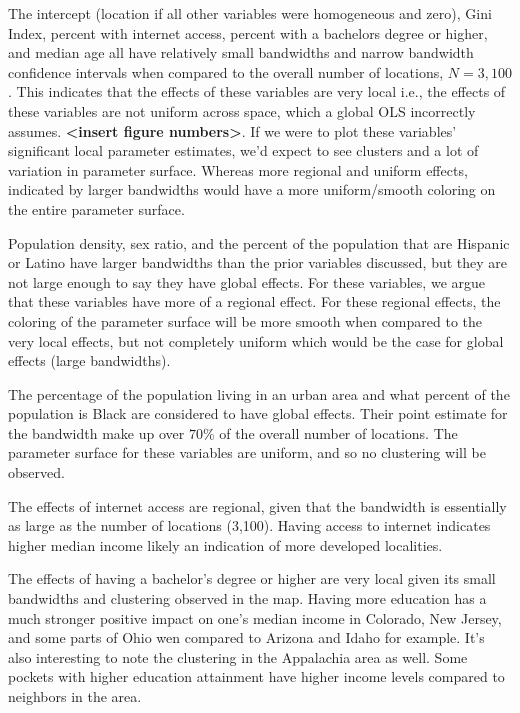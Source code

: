 \documentclass[
]{article}
\begin{document}
The intercept (location if all other variables were homogeneous and
zero), Gini Index, percent with internet access, percent with a
bachelors degree or higher, and median age all have relatively small
bandwidths and narrow bandwidth confidence intervals when compared to
the overall number of locations, \(N = 3,100\). This indicates that the
effects of these variables are very local i.e., the effects of these
variables are not uniform across space, which a global OLS incorrectly
assumes. \textbf{\textless insert figure numbers\textgreater{}}. If we
were to plot these variables' significant local parameter estimates,
we'd expect to see clusters and a lot of variation in parameter surface.
Whereas more regional and uniform effects, indicated by larger
bandwidths would have a more uniform/smooth coloring on the entire
parameter surface.

Population density, sex ratio, and the percent of the population that
are Hispanic or Latino have larger bandwidths than the prior variables
discussed, but they are not large enough to say they have global
effects. For these variables, we argue that these variables have more of
a regional effect. For these regional effects, the coloring of the
parameter surface will be more smooth when compared to the very local
effects, but not completely uniform which would be the case for global
effects (large bandwidths).

The percentage of the population living in an urban area and what
percent of the population is Black are considered to have global
effects. Their point estimate for the bandwidth make up over \(70\%\) of
the overall number of locations. The parameter surface for these
variables are uniform, and so no clustering will be observed.

The effects of internet access are regional, given that the bandwidth is
essentially as large as the number of locations (3,100). Having access
to internet indicates higher median income likely an indication of more
developed localities.

The effects of having a bachelor's degree or higher are very local given
its small bandwidths and clustering observed in the map. Having more
education has a much stronger positive impact on one's median income in
Colorado, New Jersey, and some parts of Ohio wen compared to Arizona and
Idaho for example. It's also interesting to note the clustering in the
Appalachia area as well. Some pockets with higher education attainment
have higher income levels compared to neighbors in the area.
\end{document}
